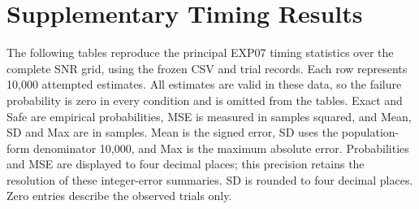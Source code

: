 \chapter[Supplementary Timing Results]{Supplementary Timing Results}
\label{app:timing}
The following tables reproduce the principal EXP07 timing statistics over the
complete SNR grid, using the frozen CSV and trial records. Each row represents
10,000 attempted estimates. All estimates are valid in these data, so the
failure probability is zero in every condition and is omitted from the tables.
Exact and Safe are empirical probabilities, MSE is measured in samples squared,
and Mean, SD and Max are in samples. Mean is the signed error, SD uses the
population-form denominator 10,000, and Max is the maximum absolute error.
Probabilities and MSE are displayed to four decimal places; this precision
retains the resolution of these integer-error summaries. SD is rounded to
four decimal places. Zero entries describe the observed trials only.

